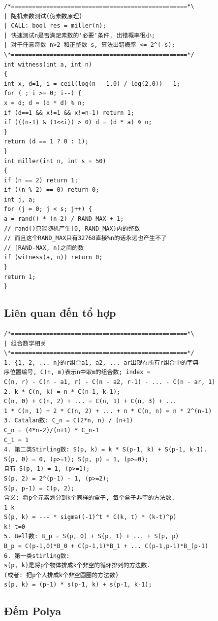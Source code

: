 \documentclass[11pt]{article}
\begin{document}
\begingroup
\scriptsize
\begin{verbatim}
/*==================================================*\
| 随机素数测试(伪素数原理)
| CALL: bool res = miller(n);
| 快速测试n是否满足素数的'必要'条件, 出错概率很小;
| 对于任意奇数 n>2 和正整数 s, 算法出错概率 <= 2^(-s);
\*==================================================*/
int witness(int a, int n)
{
int x, d=1, i = ceil(log(n - 1.0) / log(2.0)) - 1;
for ( ; i >= 0; i--) {
x = d; d = (d * d) % n;
if (d==1 && x!=1 && x!=n-1) return 1;
if (((n-1) & (1<<i)) > 0) d = (d * a) % n;
}
return (d == 1 ? 0 : 1);
}
int miller(int n, int s = 50)
{
if (n == 2) return 1;
if ((n % 2) == 0) return 0;
int j, a;
for (j = 0; j < s; j++) {
a = rand() * (n-2) / RAND_MAX + 1;
// rand()只能随机产生[0, RAND_MAX)内的整数
// 而且这个RAND_MAX只有32768直接%n的话永远也产生不了
// [RAND-MAX, n)之间的数
if (witness(a, n)) return 0;
}
return 1;
}
\end{verbatim}
\endgroup

\subsection{Liên quan đến tổ hợp}

\begingroup
\scriptsize
\begin{verbatim}
/*==================================================*\
| 组合数学相关
\*==================================================*/
1. {1, 2, ... n}的r组合a1, a2, ... ar出现在所有r组合中的字典
序位置编号, C(n, m)表示n中取m的组合数; index =
C(n, r) - C(n - a1, r) - C(n - a2, r-1) - ... - C(n - ar, 1)
2. k * C(n, k) = n * C(n-1, k-1);
C(n, 0) + C(n, 2) + ... = C(n, 1) + C(n, 3) + ...
1 * C(n, 1) + 2 * C(n, 2) + ... + n * C(n, n) = n * 2^(n-1)
3. Catalan数: C_n = C(2*n, n) / (n+1)
C_n = (4*n-2)/(n+1) * C_n-1
C_1 = 1
4. 第二类Stirling数: S(p, k) = k * S(p-1, k) + S(p-1, k-1).
S(p, 0) = 0, (p>=1); S(p, p) = 1, (p>=0);
且有 S(p, 1) = 1, (p>=1);
S(p, 2) = 2^(p-1) - 1, (p>=2);
S(p, p-1) = C(p, 2);
含义: 将p个元素划分到k个同样的盒子, 每个盒子非空的方法数.
1 k
S(p, k) = --- * sigma((-1)^t * C(k, t) * (k-t)^p)
k! t=0
5. Bell数: B_p = S(p, 0) + S(p, 1) + ... + S(p, p)
B_p = C(p-1,0)*B_0 + C(p-1,1)*B_1 + ... C(p-1,p-1)*B_(p-1)
6. 第一类stirling数:
s(p, k)是将p个物体排成k个非空的循环排列的方法数.
(或者: 把p个人排成k个非空圆圈的方法数)
s(p, k) = (p-1) * s(p-1, k) + s(p-1, k-1);
\end{verbatim}
\endgroup

\subsection{Đếm Polya}
\end{document}

